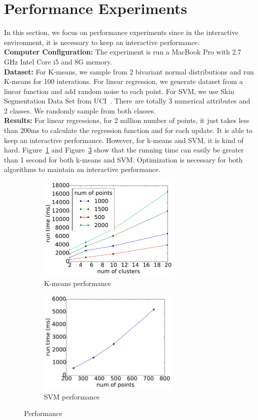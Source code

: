 \documentclass{article}
\begin{document}
\section{Performance Experiments}
In this section, we focus on performance experiments since in the interactive environment, it is necessary to keep an interactive performance. \\
\textbf{Computer Configuration:} The experiment is run a MacBook Pro with 2.7 GHz Intel Core i5 and 8G memory.\\
\textbf{Dataset:} For K-means, we sample from 2 bivariant normal distributions and run K-means for 100 interations. For linear regression, we generate dataset from a linear function and add random noise to each point. For SVM, we use Skin Segmentation Data Set from UCI~\cite{skinsegment}.  There are totally 3 numerical attributes and 2 classes. We randomly sample from both classes. \\
\textbf{Results:} For linear regressions, for 2 million number of points, it just takes less than 200ms to calculate the regression function and for each update. It is able to keep an interactive performance. However, for k-means and SVM, it is kind of hard. Figure~\ref{fig:kmeans_performance} and Figure~\ref{fig:svm_performance} show that the running time can easily be greater than 1 second for both k-means and SVM. Optimization is necessary for both algorithms to maintain an interactive performance. \\

\begin{figure}[t!]
	\centering
	\begin{subfigure}{0.47\textwidth}
		\centering
		\includegraphics[height=5cm]{figs/kmeans_result}
		\caption{K-means performance}
		\label{fig:kmeans_performance}
	\end{subfigure}%
	\begin{subfigure}{0.47\textwidth}
		\centering
		\includegraphics[height=5cm]{figs/svm_result}
		\caption{SVM performance}
		\label{fig:svm_performance}
	\end{subfigure}
	\caption{Performance}
\end{figure}
\end{document}
